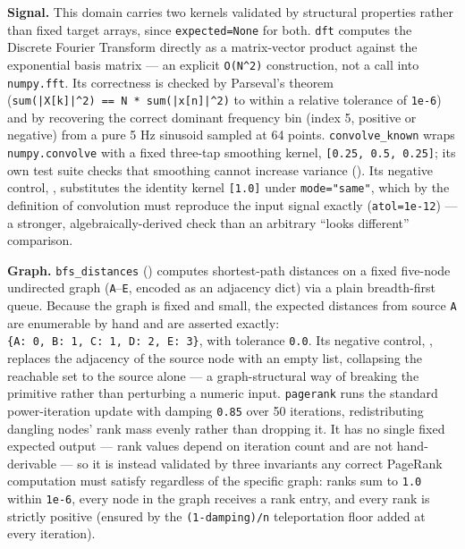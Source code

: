 \documentclass[
]{article}
\begin{document}
\textbf{Signal.} This domain carries two kernels validated by structural
properties rather than fixed target arrays, since \texttt{expected=None}
for both. \texttt{dft} computes the Discrete Fourier Transform directly
as a matrix-vector product against the exponential basis matrix
 --- an explicit \texttt{O(N\^{}2)}
construction, not a call into \texttt{numpy.fft}. Its correctness is
checked by Parseval's theorem
(\texttt{sum(|{}X{[}k{]}|{}\^{}2)\ ==\ N\ *\ sum(|{}x{[}n{]}|{}\^{}2)}
to within a relative tolerance of \texttt{1e-6}) and by recovering the
correct dominant frequency bin (index 5, positive or negative) from a
pure 5 Hz sinusoid sampled at 64 points. \texttt{convolve\_known} wraps
\texttt{numpy.convolve} with a fixed three-tap smoothing kernel,
\texttt{{[}0.25,\ 0.5,\ 0.25{]}}; its own test suite checks that
smoothing cannot increase variance
(). Its
negative control, , substitutes the
identity kernel \texttt{{[}1.0{]}} under \texttt{mode="same"}, which by
the definition of convolution must reproduce the input signal exactly
(\texttt{atol=1e-12}) --- a stronger, algebraically-derived check than
an arbitrary ``looks different'' comparison.

\textbf{Graph.} \texttt{bfs\_distances}
() computes shortest-path distances on a
fixed five-node undirected graph (\texttt{A}--\texttt{E}, encoded as an
adjacency dict) via a plain breadth-first queue. Because the graph is
fixed and small, the expected distances from source \texttt{A} are
enumerable by hand and are asserted exactly:
\texttt{\{A:\ 0,\ B:\ 1,\ C:\ 1,\ D:\ 2,\ E:\ 3\}}, with tolerance
\texttt{0.0}. Its negative control, ,
replaces the adjacency of the source node with an empty list, collapsing
the reachable set to the source alone --- a graph-structural way of
breaking the primitive rather than perturbing a numeric input.
\texttt{pagerank} runs the standard power-iteration update with damping
\texttt{0.85} over 50 iterations, redistributing dangling nodes' rank
mass evenly rather than dropping it. It has no single fixed expected
output --- rank values depend on iteration count and are not
hand-derivable --- so it is instead validated by three invariants any
correct PageRank computation must satisfy regardless of the specific
graph: ranks sum to \texttt{1.0} within \texttt{1e-6}, every node in the
graph receives a rank entry, and every rank is strictly positive
(ensured by the \texttt{(1-damping)/n} teleportation floor added at
every iteration).
\end{document}
